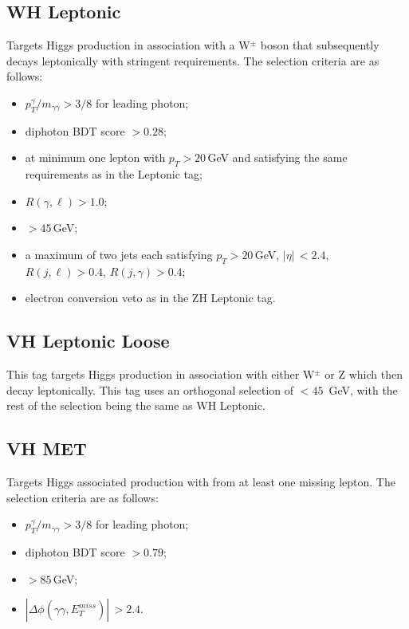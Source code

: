 \subsection{WH Leptonic}
Targets Higgs production in association with a W$^{\pm}$ boson that subsequently decays leptonically with stringent requirements. The selection criteria are as follows:
\begin{itemize}[noitemsep]
    \item $p^{\gamma}_{T}/m_{\gamma\gamma} > 3/8$ for leading photon;
    \item diphoton BDT score $> 0.28$;
    \item at minimum one lepton with $p_T > 20$\,GeV and satisfying the same requirements as in the \ttH Leptonic tag;
    \item $R(\gamma,\ell) > 1.0$;
    \item \MET$> 45$\,GeV;
    \item a maximum of two jets each satisfying $p_T > 20$\,GeV, $|\eta|\, < 2.4$, $R(j,\ell) > 0.4$, $R(j,\gamma) > 0.4$;
    \item electron conversion veto as in the ZH Leptonic tag.
\end{itemize}



\subsection{VH Leptonic Loose}
This tag targets Higgs production in association with either W$^{\pm}$ or Z which then decay leptonically. 
This tag uses an orthogonal \MET selection of \MET$ < 45$\, GeV, with the rest of the selection being the same as WH Leptonic.

\subsection{VH MET}
Targets Higgs associated production with \MET from at least one missing lepton. The selection criteria are as follows:
\begin{itemize}[noitemsep]
    \item $p^{\gamma}_{T}/m_{\gamma\gamma} > 3/8$ for leading photon;
    \item diphoton BDT score $> 0.79$;
    \item \MET$> 85$\,GeV;
    \item $|\Delta\phi(\gamma\gamma,E_{T}^{miss})|\, > 2.4$.
\end{itemize}


